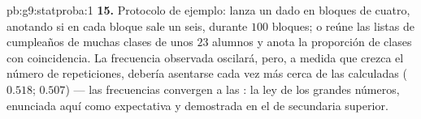 \begin{solution}{pb:g9:statproba:1}
\textbf{15.} Protocolo de ejemplo: lanza un dado en bloques de cuatro,
anotando si en cada bloque sale un seis, durante $100$ bloques; o
reúne las listas de cumpleaños de muchas clases de unos $23$ alumnos y
anota la proporción de clases con coincidencia. La
frecuencia observada oscilará, pero, a medida que crezca el número de repeticiones,
debería asentarse cada vez más cerca de las  calculadas
($0.518$; $0.507$) --- las frecuencias convergen a las :
la ley de los grandes números, enunciada aquí como expectativa y
demostrada en el  de secundaria superior.
\end{solution}
